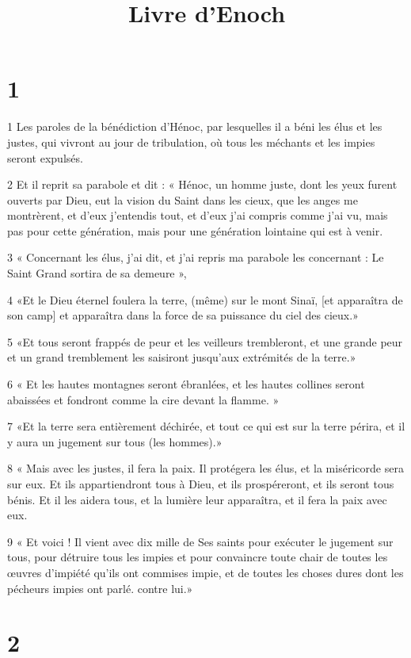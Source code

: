

\title{Livre d'Enoch}


\chapter{1}

\par 1 Les paroles de la bénédiction d'Hénoc, par lesquelles il a béni les élus et les justes, qui vivront au jour de tribulation, où tous les méchants et les impies seront expulsés.
\par 2 Et il reprit sa parabole et dit : « Hénoc, un homme juste, dont les yeux furent ouverts par Dieu, eut la vision du Saint dans les cieux, que les anges me montrèrent, et d'eux j'entendis tout, et d'eux j'ai compris comme j'ai vu, mais pas pour cette génération, mais pour une génération lointaine qui est à venir.
\par 3 « Concernant les élus, j'ai dit, et j'ai repris ma parabole les concernant : Le Saint Grand sortira de sa demeure »,
\par 4 «Et le Dieu éternel foulera la terre, (même) sur le mont Sinaï, [et apparaîtra de son camp] et apparaîtra dans la force de sa puissance du ciel des cieux.»
\par 5 «Et tous seront frappés de peur et les veilleurs trembleront, et une grande peur et un grand tremblement les saisiront jusqu'aux extrémités de la terre.»
\par 6 « Et les hautes montagnes seront ébranlées, et les hautes collines seront abaissées et fondront comme la cire devant la flamme. »
\par 7 «Et la terre sera entièrement déchirée, et tout ce qui est sur la terre périra, et il y aura un jugement sur tous (les hommes).»
\par 8 « Mais avec les justes, il fera la paix. Il protégera les élus, et la miséricorde sera sur eux. Et ils appartiendront tous à Dieu, et ils prospéreront, et ils seront tous bénis. Et il les aidera tous, et la lumière leur apparaîtra, et il fera la paix avec eux.
\par 9 « Et voici ! Il vient avec dix mille de Ses saints pour exécuter le jugement sur tous, pour détruire tous les impies et pour convaincre toute chair de toutes les œuvres d'impiété qu'ils ont commises impie, et de toutes les choses dures dont les pécheurs impies ont parlé. contre lui.»

\chapter{2}

